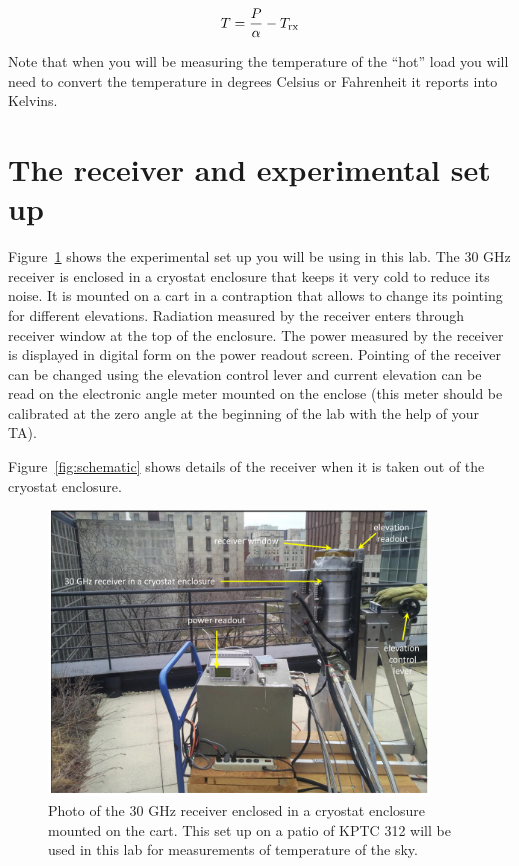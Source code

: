 \begin{equation}
T={P\over \alpha} - T_\textrm{rx}
\label{five}
\end{equation}

Note that when you will be measuring the temperature of the ``hot'' load you will need to convert the temperature in degrees Celsius or Fahrenheit it reports into Kelvins.

\section{The receiver and experimental set up}

Figure~\ref{fig:CMBLab-photo} shows the experimental set up you will be using in this lab. The 30 GHz receiver is enclosed in a cryostat enclosure that keeps it very cold to reduce its noise. It is mounted on a cart in a contraption that allows to change its pointing for different elevations. Radiation measured by the receiver enters through receiver window at the top of the enclosure. The power measured by the receiver is displayed in digital form on the power readout screen. Pointing of the receiver can be changed using the elevation control lever and current elevation can be read on the electronic angle meter mounted on the enclose (this meter should be calibrated at the zero angle at the beginning of the lab with the help of your TA).

Figure~\ref{fig:schematic} shows details of the receiver when it is taken out of the cryostat enclosure.

\begin{figure}[ht]
	\begin{center}
		\includegraphics[trim=0pt 0pt 0pt 0pt,width=0.9\textwidth]{cmb/receiver_setup_new.pdf}
		\caption{Photo of the 30 GHz receiver enclosed in a cryostat enclosure mounted on the cart. This set up on a patio of KPTC 312 will be used in this lab for measurements of temperature of the sky.}
		\label{fig:CMBLab-photo}
	\end{center}
\end{figure}

